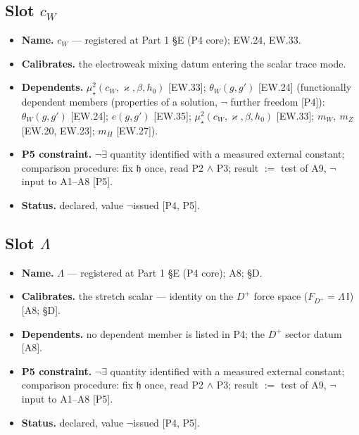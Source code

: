 \documentclass[11pt,openany]{report}
\theoremstyle{canonplain}
\theoremstyle{canondef}
\begin{document}
\subsection*{Slot $c_W$}
\begin{itemize}\setlength{\itemsep}{2pt}
\item \textbf{Name.} $c_W$ — registered at Part 1 §E (P4 core); EW.24, EW.33.
\item \textbf{Calibrates.} the electroweak mixing datum entering the scalar trace mode.
\item \textbf{Dependents.} $\mu_\star^2(c_W,\varkappa,\beta,h_0)$ [EW.33]; $\theta_W(g,g')$ [EW.24] (functionally dependent members (properties of a solution, $\neg$ further freedom [P4]): $\theta_W(g,g')$ [EW.24]; $e(g,g')$ [EW.35]; $\mu_\star^2(c_W,\varkappa,\beta,h_0)$ [EW.33]; $m_W,\ m_Z$ [EW.20, EW.23]; $m_H$ [EW.27]).
\item \textbf{P5 constraint.} $\neg\exists$ quantity identified with a measured external constant; comparison procedure: fix $\mathfrak h$ once, read P2 $\wedge$ P3; result $:=$ test of A9, $\neg$ input to A1--A8 [P5].
\item \textbf{Status.} declared, value $\neg$issued [P4, P5].
\end{itemize}
\subsection*{Slot $\Lambda$}
\begin{itemize}\setlength{\itemsep}{2pt}
\item \textbf{Name.} $\Lambda$ — registered at Part 1 §E (P4 core); A8; §D.
\item \textbf{Calibrates.} the stretch scalar — identity on the $D^+$ force space ($F_{D^+}=\Lambda\,\mathbb I$) [A8; §D].
\item \textbf{Dependents.} no dependent member is listed in P4; the $D^+$ sector datum [A8].
\item \textbf{P5 constraint.} $\neg\exists$ quantity identified with a measured external constant; comparison procedure: fix $\mathfrak h$ once, read P2 $\wedge$ P3; result $:=$ test of A9, $\neg$ input to A1--A8 [P5].
\item \textbf{Status.} declared, value $\neg$issued [P4, P5].
\end{itemize}
\end{document}
